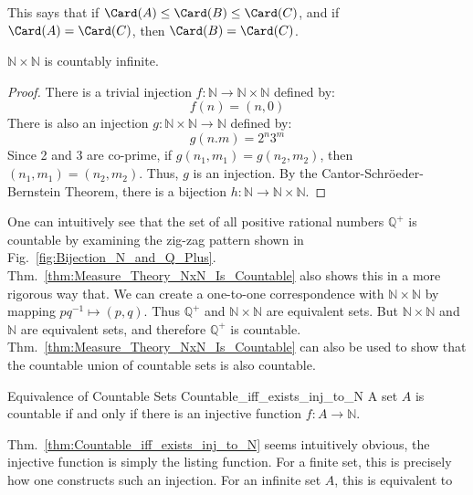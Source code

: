     This says that if $\Card(A)\leq\Card(B)\leq\Card(C)$,
    and if $\Card(A)=\Card(C)$, then $\Card(B)=\Card(C)$.
    \begin{theorem}
        \label{thm:Measure_Theory_NxN_Is_Countable}
        $\mathbb{N}\times\mathbb{N}$ is countably infinite.
    \end{theorem}
    \begin{proof}
        There is a trivial injection
        $f:\mathbb{N}\rightarrow\mathbb{N}\times\mathbb{N}$
        defined by:
        \begin{equation}
            f(n)=(n,0)
        \end{equation}
        There is also an injection
        $g:\mathbb{N}\times\mathbb{N}\rightarrow\mathbb{N}$
        defined by:
        \begin{equation}
            g(n.m)=2^{n}3^{m}
        \end{equation}
        Since 2 and 3 are co-prime, if
        $g(n_{1},m_{1})=g(n_{2},m_{2})$, then
        $(n_{1},m_{1})=(n_{2},m_{2})$. Thus, $g$ is an injection.
        By the Cantor-Schr\"{o}eder-Bernstein Theorem, there is a
        bijection $h:\mathbb{N}\rightarrow\mathbb{N}\times\mathbb{N}$.
    \end{proof}
    One can intuitively see that the set of all positive
    rational numbers $\mathbb{Q}^{+}$ is countable by examining
    the zig-zag pattern shown in
    Fig.~\ref{fig:Bijection_N_and_Q_Plus}.
    Thm.~\ref{thm:Measure_Theory_NxN_Is_Countable} also
    shows this in a more rigorous way that. We can create
    a one-to-one correspondence with
    $\mathbb{N}\times\mathbb{N}$ by mapping
    $pq^{\minus{1}}\mapsto(p,q)$. Thus $\mathbb{Q}^{+}$
    and $\mathbb{N}\times\mathbb{N}$ are equivalent sets.
    But $\mathbb{N}\times\mathbb{N}$ and $\mathbb{N}$
    are equivalent sets, and therefore $\mathbb{Q}^{+}$
    is countable.
    Thm.~\ref{thm:Measure_Theory_NxN_Is_Countable} can also be used
    to show that the countable union of countable sets is also
    countable.
    \begin{ltheorem}{Equivalence of Countable Sets}
          {Countable_iff_exists_inj_to_N}
        A set $A$ is countable if and only if there is an injective
        function $f:A\rightarrow\mathbb{N}$.
    \end{ltheorem}
    Thm.~\ref{thm:Countable_iff_exists_inj_to_N} seems
    intuitively obvious, the injective function is
    simply the listing function. For a finite set, this
    is precisely how one constructs such an injection.
    For an infinite set $A$, this is equivalent to
